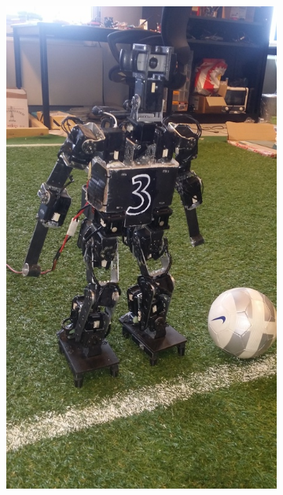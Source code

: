 \begin{figure}[htb]
\begin{subfigure}{0.3\paperwidth}
        \includegraphics[angle=-90,width=0.9\linewidth]{../media/sigmaban_1_4.jpg}
    \end{subfigure}
    \begin{subfigure}{0.3\paperwidth}
        \centering

\end{subfigure}
\end{figure}

